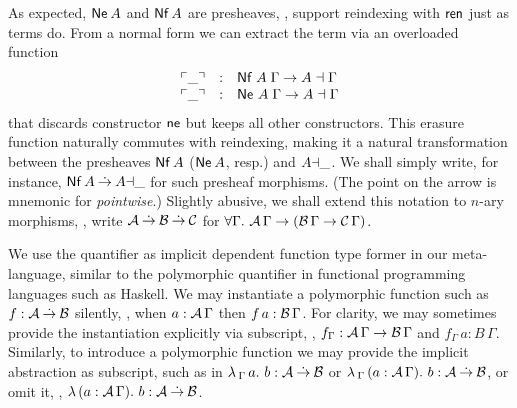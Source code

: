 \documentclass[sigconf,screen,fleqn]{acmart} %
\begin{document}
As expected, $\mathsf{Ne}^{}\,A$ and $\mathsf{Nf}\,A$ are presheaves,
\ie, support reindexing with $\mathsf{ren}$ just as terms do.
From a normal form we can extract the term via an overloaded function
\[
\begin{array}{lcl}
\ulcorner\_\urcorner & : & \mathsf{Nf}\;A\;\Gamma \to A \dashv \Gamma \\
\ulcorner\_\urcorner & : & \mathsf{Ne}^{}\;A\;\Gamma \to A \dashv \Gamma \\
\end{array}
\]
that discards constructor $\mathsf{ne}$ but keeps all other constructors.
This erasure function naturally commutes with reindexing, making it a
natural transformation between the presheaves $\mathsf{Nf}\,A$ ($\mathsf{Ne}^{}\,A$,
resp.) and $A{\dashv}\_$.  We shall simply write, for instance,
$\mathsf{Nf}\,A \mathbin{\dot{\to}} A{\dashv}\_$ for such presheaf morphisms.
(The point on the arrow is mnemonic for \emph{pointwise}.)
Slightly abusive, we shall extend this notation to $n$-ary
morphisms, \eg, write $\mathcal{A} \mathbin{\dot{\to}} \mathcal{B} \mathbin{\dot{\to}} \mathcal{C}$ for
$\forall \Gamma.\ \mathcal{A}\,\Gamma \to (\mathcal{B}\,\Gamma \to \mathcal{C}\,\Gamma)$.

We use the \fbox{$\forall$} quantifier as implicit dependent function
type former in our meta-language,
similar to the polymorphic quantifier in functional
programming languages such as Haskell.  We may instantiate a
polymorphic function such as $f : \mathcal{A} \mathbin{\dot{\to}} \mathcal{B}$ silently, \eg, when $a
: \mathcal{A}\,\Gamma$ then $f\,a : \mathcal{B}\,\Gamma$.  For clarity, we may sometimes
provide the instantiation explicitly via subscript, \eg, $f_\Gamma :
\mathcal{A}\,\Gamma \to \mathcal{B}\,\Gamma$ and $f_\Gamma\,a : B\,\Gamma$.  Similarly,
to introduce a polymorphic function we may provide the implicit
abstraction as subscript, such as in
$\lambda\,{}_\Gamma\, a.\ b : \mathcal{A} \mathbin{\dot{\to}} \mathcal{B}$ or
$\lambda\,{}_\Gamma\, (a : \mathcal{A}\,\Gamma).\ b : \mathcal{A} \mathbin{\dot{\to}} \mathcal{B}$, or
omit it, \eg,
$\lambda\,(a : \mathcal{A}\,\Gamma).\ b : \mathcal{A} \mathbin{\dot{\to}} \mathcal{B}$.
\end{document}
